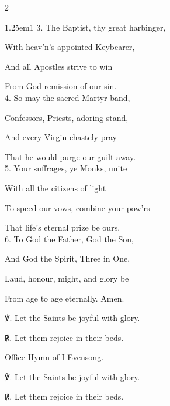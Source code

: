 \begin{paracol}{2}
\begin{hangparas}{1.25em}{1}
3. The Baptist, thy great harbinger,

With heav'n's appointed Keybearer,

And all Apostles strive to win

From God remission of our sin.\\

4. So may the sacred Martyr band,

Confessors, Priests, adoring stand,

And every Virgin chastely pray

That he would purge our guilt away.\\

5. Your suffrages, ye Monks, unite

With all the citizens of light

To speed our vows, combine your pow'rs

That life’s eternal prize be ours.\\

6. To God the Father, God the Son,

And God the Spirit, Three in One,

Laud, honour, might, and glory be

From age to age eternally. Amen.\\
\end{hangparas}

℣. Let the Saints be joyful with glory.

℟. Let them rejoice in their beds.


\fussy	
\end{paracol}


\secondEvensong
{}

\begin{rubric}
	Office Hymn of I Evensong.
\end{rubric}

℣. Let the Saints be joyful with glory.

℟. Let them rejoice in their beds.



